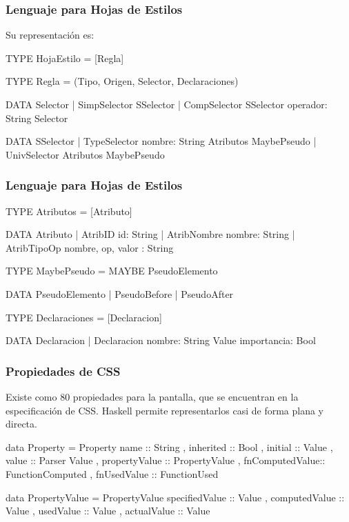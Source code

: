 \documentclass[12pt]{beamer}
\begin{document}
\begin{frame}[fragile]
\frametitle{Lenguaje para Hojas de Estilos}
Su representación es:
\begin{block}{}
\begin{ag}
TYPE HojaEstilo = [Regla]

TYPE Regla = (Tipo, Origen, Selector, Declaraciones)

DATA Selector
  | SimpSelector SSelector
  | CompSelector SSelector 
                 operador: String
                 Selector

DATA SSelector
  | TypeSelector nombre: String
                 Atributos 
                 MaybePseudo
  | UnivSelector Atributos MaybePseudo
\end{ag}
\end{block}
\end{frame}

\begin{frame}[fragile]
\frametitle{Lenguaje para Hojas de Estilos}
\begin{block}{}
\begin{ag}
TYPE Atributos = [Atributo]

DATA Atributo
  | AtribID     id: String
  | AtribNombre nombre: String
  | AtribTipoOp nombre, op, valor : String

TYPE MaybePseudo = MAYBE PseudoElemento

DATA PseudoElemento
  | PseudoBefore
  | PseudoAfter

TYPE Declaraciones = [Declaracion]

DATA Declaracion 
  | Declaracion nombre: String Value importancia: Bool
\end{ag}
\end{block}
\end{frame}

\begin{frame}[fragile]
\frametitle{Propiedades de CSS}
Existe como 80 propiedades para la pantalla, que se encuentran en la especificación de CSS.
Haskell permite representarlos casi de forma plana y directa.

\begin{block}{}
\begin{hs}
data Property 
  = Property { name           :: String
             , inherited      :: Bool
             , initial        :: Value
             , value          :: Parser Value
             , propertyValue  :: PropertyValue
             , fnComputedValue:: FunctionComputed
             , fnUsedValue    :: FunctionUsed }

data PropertyValue
  = PropertyValue { specifiedValue :: Value
                  , computedValue  :: Value
                  , usedValue      :: Value
                  , actualValue    :: Value }
\end{hs}
\end{block}
\end{frame}
\end{document}
